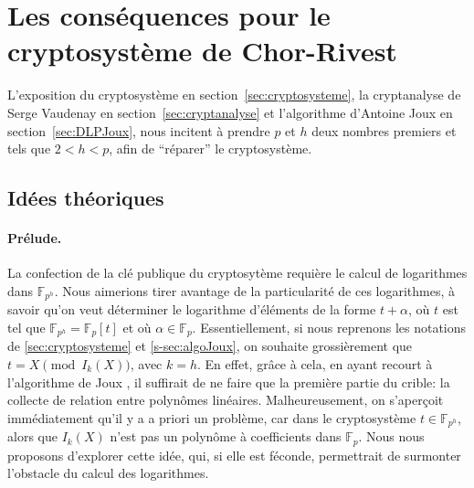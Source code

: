 \documentclass[a4paper, titlepage, 11pt]{article}
\theoremstyle{definition}
\theoremstyle{remark}
\def\gf #1{\mathbb{F}_{#1}}
\begin{document}
\section{Les conséquences pour le cryptosystème de Chor-Rivest}\label{sec:consequences}

L'exposition du cryptosystème en section~\ref{sec:cryptosysteme}, la cryptanalyse de Serge Vaudenay en section~\ref{sec:cryptanalyse} et l'algorithme d'Antoine Joux en section~\ref{sec:DLPJoux}, nous incitent à prendre $p$ et $h$ deux nombres premiers et tels que $2 < h < p$, afin de ``réparer'' le cryptosystème.


\subsection{Idées théoriques}

\paragraph{Prélude.} La confection de la clé publique du cryptosytème requière le calcul de logarithmes dans $\gf{p^h}$. Nous aimerions tirer avantage de la particularité de ces logarithmes, à savoir qu'on veut déterminer le logarithme d'éléments de la forme $t + \alpha$, où $t$ est tel que $\gf{p^h} = \gf{p}[t]$ et où $\alpha \in \gf{p}$. Essentiellement, si nous reprenons les notations de \ref{sec:cryptosysteme} et \ref{s-sec:algoJoux}, on souhaite grossièrement que $t = X \pmod{I_k(X)}$, avec $k = h$. En effet, grâce à cela, en ayant recourt à l'algorithme de Joux \cite{joux2013}, il suffirait de ne faire que la première partie du crible: la collecte de relation entre polynômes linéaires. Malheureusement, on s’aperçoit immédiatement qu'il y a a priori un problème, car dans le cryptosystème $t \in \gf{p^h}$, alors que $I_k(X)$ n'est pas un polynôme à coefficients dans $\gf{p}$. Nous nous proposons d'explorer cette idée, qui, si elle est féconde, permettrait de surmonter l'obstacle du calcul des logarithmes. 
\end{document}
